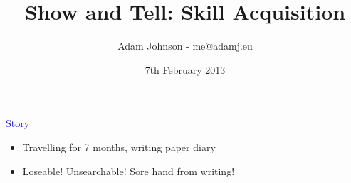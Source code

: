 \documentclass[landscape]{slides}
\title{Show and Tell: Skill Acquisition}
\author{Adam Johnson - me@adamj.eu}
\date{7th February 2013}
\begin{document}
\maketitle

\begin{slide}

    \textcolor{blue}{\Large{Story}}

    \begin{itemize}
        \item Travelling for 7 months, writing paper diary
        \item Loseable! Unsearchable! Sore hand from writing!
    \end{itemize}

\end{slide}
\end{document}
